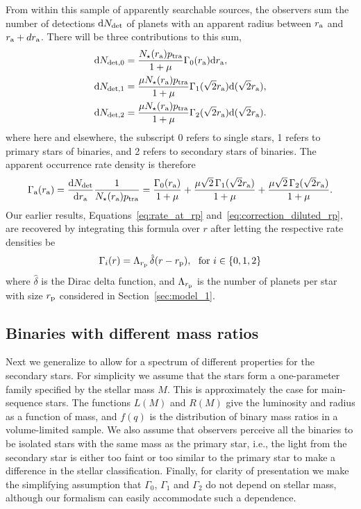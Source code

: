 \documentclass[12pt,modern]{aastex61}
\renewcommand{\a}{_{\rm a}}
\newcommand{\p}{_{\rm p}}
\begin{document}
From within this sample of apparently searchable sources, the
observers sum the number of detections ${\rm d}N_{\rm det}$ of planets
with an apparent radius between $r\a$ and $r\a + dr\a$.  There will be
three contributions to this sum,
\begin{align}
  {\rm d}N_{{\rm det},0} &= 
      \frac{N_\star(r\a) p_{\rm tra}}{1+\mu}
      \Gamma_0(r\a)\mathrm{d}r\a,
  \label{eq:n0} \\
  {\rm d}N_{{\rm det},1} &= 
      \frac{\mu N_\star(r\a) p_{\rm tra}}{1+\mu} 
      \Gamma_1(\sqrt{2}r\a)\mathrm{d}(\sqrt{2}r\a),
	\label{eq:n1} \\
  {\rm d}N_{{\rm det},2} &=
      \frac{\mu N_\star(r\a) p_{\rm tra}}{1+\mu} 
      \Gamma_2(\sqrt{2}r\a)\mathrm{d}(\sqrt{2}r\a).
	\label{eq:n2}
\end{align}
where here and elsewhere, the subscript 0 refers to single stars, 1
refers to primary stars of binaries, and 2 refers to secondary stars
of binaries. The apparent occurrence rate density is therefore
\begin{equation}
  \Gamma\a(r\a) = \frac{{\rm d}N_{\rm det}}{{\rm d}r\a} \frac{1}{N_\star(r\a) p_{\rm tra}} =
  \frac{\Gamma_0(r\a)}{1+\mu} +
  \frac{\mu\sqrt{2}\,\Gamma_1(\sqrt{2}r\a)}{1+\mu} +
  \frac{\mu\sqrt{2}\,\Gamma_2(\sqrt{2}r\a)}{1+\mu}.
	\label{eq:formula_twin_binary}
\end{equation}
Our earlier results, Equations~\ref{eq:rate_at_rp}
and~\ref{eq:correction_diluted_rp}, are recovered by integrating this
formula over $r$ after letting the respective rate densities be
\begin{equation}
  \Gamma_i(r) = \Lambda_{r\p}\, \hat{\delta}(r-r\p),~~{\rm for}\ i\in\{0,1,2\}
\end{equation}
where $\hat{\delta}$ is the Dirac delta function, and $\Lambda_{r\p}$
is the number of planets per star with size $r\p$ considered in
Section~\ref{sec:model_1}.

\subsection{Binaries with different mass ratios}
\label{sec:general_formula}

Next we generalize to allow for a spectrum of different properties for
the secondary stars.  For simplicity we assume that the stars form a
one-parameter family specified by the stellar mass $M$.  This is
approximately the case for main-sequence stars.  The functions $L(M)$
and $R(M)$ give the luminosity and radius as a function of mass, and
$f(q)$ is the distribution of binary mass ratios in a volume-limited
sample.  We also assume that observers perceive all the binaries to be
isolated stars with the same mass as the primary star, i.e., the light
from the secondary star is either too faint or too similar to the
primary star to make a difference in the stellar classification.
Finally, for clarity of presentation we make the simplifying
assumption that $\Gamma_0$, $\Gamma_1$ and $\Gamma_2$ do not depend on
stellar mass, although our formalism can easily accommodate such a
dependence.
\end{document}
